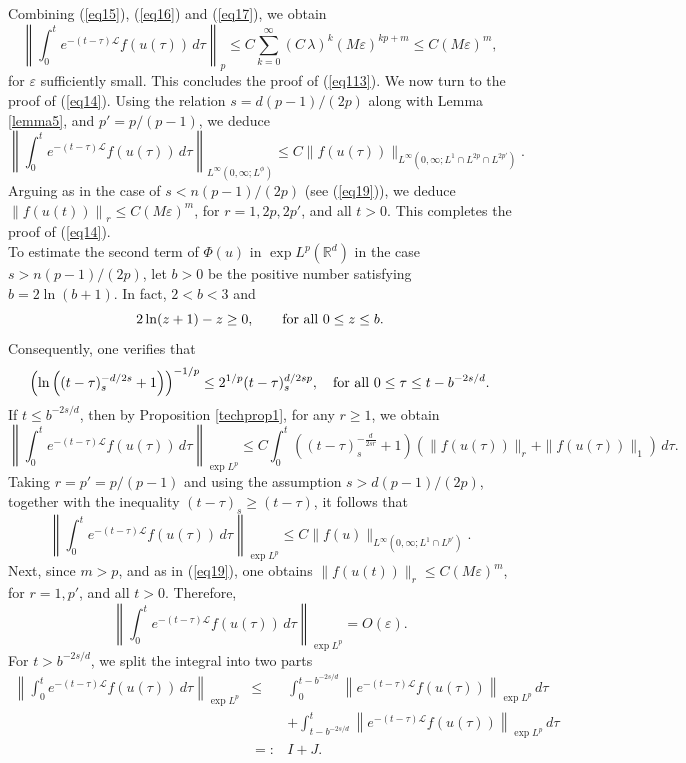 \documentclass[a4paper,11pt]{amsart}
\renewcommand\eqref[1]{(\ref{#1})} %
\numberwithin{equation}{section}
\theoremstyle{plain}
\theoremstyle{definition}
\begin{document}
Combining (\ref{eq15}), (\ref{eq16}) and (\ref{eq17}), we obtain
$$
\left\|\int_0^te^{-(t-\tau)\mathcal{L}} f(u(\tau))\,d\tau\right\|_{p} \leq C\sum_{k=0}^{\infty}(C\,\lambda)^k (M\varepsilon)^{kp+m}\leq C(M\varepsilon)^m,
$$
for $\varepsilon$ sufficiently small. This concludes the proof of \eqref{eq113}. We now turn to the proof of \eqref{eq14}. Using the relation $s=d(p-1)/(2 p)$ along with Lemma \ref{lemma5}, and $p'=p/(p-1)$, we deduce
 $$\left\|\int_0^te^{-(t-\tau)\mathcal{L}} f(u(\tau))\,d\tau\right\|_{L^\infty(0,\infty;L^\phi)}\leq C\|f(u(\tau))\|_{L^\infty(0,\infty;L^1\cap L^{2p}\cap L^{2p'})}.$$ 
Arguing as in the case of $s<n(p-1)/(2 p)$ (see (\ref{eq19})), we deduce $\left\|f(u(t))\right\|_{r}\leq C(M\varepsilon)^m$, for $r=1,2p, 2p'$, and all $t>0$. This completes the proof of \eqref{eq14}.\\
To estimate the second term of $\Phi(u)$ in $\exp L^p(\mathbb{R}^d)$ in the case $s>n(p-1)/(2 p)$, let $b>0$ be the positive number satisfying $b=2\ln(b+1)$. In fact, $2<b<3$ and
$$2\ln(z+1)-z\geq0,\qquad \hbox{for all}\,\, 0\leq z\leq b.$$
 Consequently, one verifies that
 \begin{equation}\label{eq18}
\left(\ln\left((t-\tau)_s^{-d/2s}+1\right)\right)^{-1/p}\leq 2^{1/p}(t-\tau)_s^{d/2s p},\quad\hbox{for all}\,\,0\leq \tau\leq t-b^{-2s/d}.
\end{equation}
If $t\leq b^{-2s/d}$, then by Proposition \ref{techprop1}, for any $r\geq 1$, we obtain
$$
\left\|\int_0^te^{-(t-\tau)\mathcal{L}} f(u(\tau))\,d\tau\right\|_{\exp L^p} \leq  C\int_0^t\left((t-\tau)_s^{-\frac{d}{2 s r}}+1\right)\left(\|f(u(\tau))\|_r+\|f(u(\tau))\|_1\right)\,d\tau.
$$
Taking $r=p'=p/(p-1)$ and using the assumption $s>d(p-1)/(2p)$, together with the inequality $(t-\tau)_s\geq (t-\tau)$, it follows that
\begin{equation}\label{eq20}
\left\|\int_0^t e^{-(t-\tau)\mathcal{L}} f(u(\tau))\,d\tau\right\|_{\exp L^p} \leq C\|f(u)\|_{L^\infty(0,\infty;L^1\cap L^{p'})}.
\end{equation}
Next, since $m>p$, and as  in \eqref{eq19}, one obtains $\|f(u(t))\|_{r}
\leq  C (M\varepsilon)^m$, for  $r=1,p'$, and all $t>0$. Therefore,
\[
\left\|\int_0^t e^{-(t-\tau)\mathcal{L}} f(u(\tau))\,d\tau\right\|_{\exp L^p}
=
O(\varepsilon).
\]
For $t> b^{-2s/d}$, we split the integral into two parts
\begin{eqnarray*}
\left\|\int_0^t e^{-(t-\tau)\mathcal{L}} f(u(\tau))\,d\tau\right\|_{\exp L^p}
&\le&
\int_0^{t-b^{-2s/d}}
\left\|e^{-(t-\tau)\mathcal{L}} f(u(\tau))\right\|_{\exp L^p}
\,d\tau
\\
&&
+\int_{t-b^{-2s/d}}^t
\left\|e^{-(t-\tau)\mathcal{L}} f(u(\tau))\right\|_{\exp L^p}
\,d\tau
\\
&=:& I + J.
\end{eqnarray*}
\end{document}
